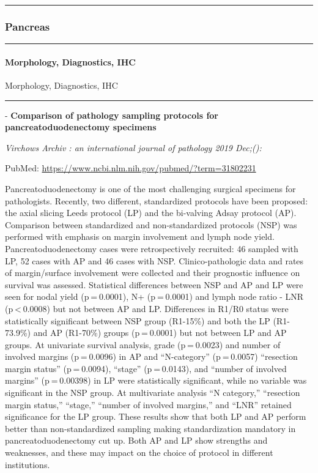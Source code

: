 \documentclass[
]{article}
\renewcommand{\linethickness}{0.05em}
\begin{document}
\begin{center}\rule{0.5\linewidth}{\linethickness}\end{center}

\hypertarget{pancreas}{%
\subsubsection{Pancreas}\label{pancreas}}

\begin{center}\rule{0.5\linewidth}{\linethickness}\end{center}

\hypertarget{pancreas_morphology}{%
\paragraph{Morphology, Diagnostics, IHC}\label{pancreas_morphology}}

Morphology, Diagnostics, IHC

\begin{center}\rule{0.5\linewidth}{\linethickness}\end{center}

- \textbf{Comparison of pathology sampling protocols for
pancreatoduodenectomy specimens}

\emph{Virchows Archiv : an international journal of pathology 2019
Dec;():}

PubMed: \url{https://www.ncbi.nlm.nih.gov/pubmed/?term=31802231}

Pancreatoduodenectomy is one of the most challenging surgical specimens
for pathologists. Recently, two different, standardized protocols have
been proposed: the axial slicing Leeds protocol (LP) and the bi-valving
Adsay protocol (AP). Comparison between standardized and
non-standardized protocols (NSP) was performed with emphasis on margin
involvement and lymph node yield. Pancreatoduodenectomy cases were
retrospectively recruited: 46 sampled with LP, 52 cases with AP and 46
cases with NSP. Clinico-pathologic data and rates of margin/surface
involvement were collected and their prognostic influence on survival
was assessed. Statistical differences between NSP and AP and LP were
seen for nodal yield (p = 0.0001), N+ (p = 0.0001) and lymph node ratio
- LNR (p \textless{} 0.0008) but not between AP and LP. Differences in
R1/R0 status were statistically significant between NSP group (R1-15\%)
and both the LP (R1-73.9\%) and AP (R1-70\%) groups (p = 0.0001) but not
between LP and AP groups. At univariate survival analysis, grade
(p = 0.0023) and number of involved margins (p = 0.0096) in AP and
``N-category'' (p = 0.0057) ``resection margin status'' (p = 0.0094),
``stage'' (p = 0.0143), and ``number of involved margins'' (p = 0.00398)
in LP were statistically significant, while no variable was significant
in the NSP group. At multivariate analysis ``N category,'' ``resection
margin status,'' ``stage,'' ``number of involved margins,'' and ``LNR''
retained significance for the LP group. These results show that both LP
and AP perform better than non-standardized sampling making
standardization mandatory in pancreatoduodenectomy cut up. Both AP and
LP show strengths and weaknesses, and these may impact on the choice of
protocol in different institutions.
\end{document}
